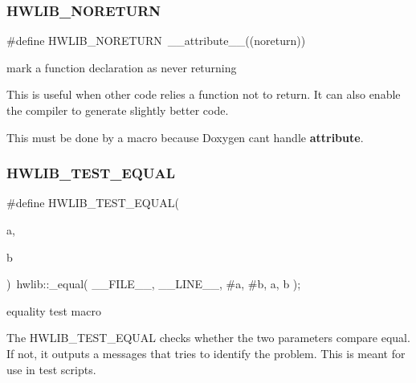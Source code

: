 \subsubsection{\texorpdfstring{H\+W\+L\+I\+B\+\_\+\+N\+O\+R\+E\+T\+U\+RN}{HWLIB\_NORETURN}}
{\footnotesize\ttfamily \#define H\+W\+L\+I\+B\+\_\+\+N\+O\+R\+E\+T\+U\+RN~\+\_\+\+\_\+attribute\+\_\+\+\_\+((noreturn))}

mark a function declaration as never returning

This is useful when other code relies a function not to return. It can also enable the compiler to generate slightly better code.

This must be done by a macro because Doxygen can\textquotesingle{}t handle {\bfseries attribute}. \mbox{\label{hwlib-defines_8hpp_aad56b336cfbb41a3f3c76aa44ea90af2}} 
\subsubsection{\texorpdfstring{H\+W\+L\+I\+B\+\_\+\+T\+E\+S\+T\+\_\+\+E\+Q\+U\+AL}{HWLIB\_TEST\_EQUAL}}
{\footnotesize\ttfamily \#define H\+W\+L\+I\+B\+\_\+\+T\+E\+S\+T\+\_\+\+E\+Q\+U\+AL(\begin{DoxyParamCaption}\item[{}]{a,  }\item[{}]{b }\end{DoxyParamCaption})~hwlib\+::\+\_\+equal( \+\_\+\+\_\+\+F\+I\+L\+E\+\_\+\+\_\+, \+\_\+\+\_\+\+L\+I\+N\+E\+\_\+\+\_\+, \#a, \#b, a, b );}

equality test macro

The H\+W\+L\+I\+B\+\_\+\+T\+E\+S\+T\+\_\+\+E\+Q\+U\+AL checks whether the two parameters compare equal. If not, it outputs a messages that tries to identify the problem. This is meant for use in test scripts. \mbox{\label{hwlib-defines_8hpp_a536d8e892418f0e4127db75a6f653add}} 
